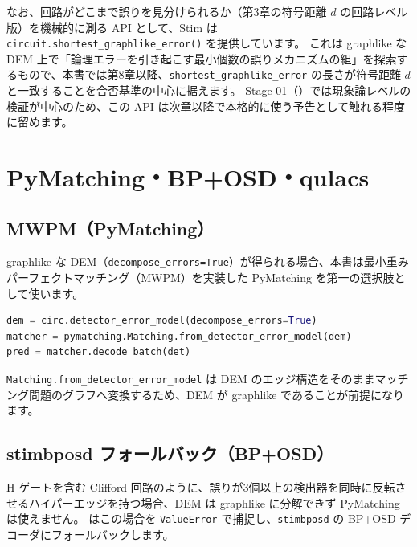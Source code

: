 なお、回路がどこまで誤りを見分けられるか（第3章の符号距離 $d$ の回路レベル版）を機械的に測る API として、Stim は \texttt{circuit.shortest\_graphlike\_error()} を提供しています。
これは graphlike な DEM 上で「論理エラーを引き起こす最小個数の誤りメカニズムの組」を探索するもので、本書では第8章以降、\texttt{shortest\_graphlike\_error} の長さが符号距離 $d$ と一致することを合否基準の中心に据えます。
Stage 01（）では現象論レベルの検証が中心のため、この API は次章以降で本格的に使う予告として触れる程度に留めます。

\section{PyMatching・BP+OSD・qulacs}\label{sec:decoders}

\subsection{MWPM（PyMatching）}

graphlike な DEM（\texttt{decompose\_errors=True}）が得られる場合、本書は最小重みパーフェクトマッチング（MWPM）を実装した PyMatching を第一の選択肢として使います。

\begin{lstlisting}[language=Python, caption={MWPM デコードの基本形（src/stages/01\_mpp/src/ftqc/ 各ファイル共通）}]
dem = circ.detector_error_model(decompose_errors=True)
matcher = pymatching.Matching.from_detector_error_model(dem)
pred = matcher.decode_batch(det)
\end{lstlisting}

\texttt{Matching.from\_detector\_error\_model} は DEM のエッジ構造をそのままマッチング問題のグラフへ変換するため、DEM が graphlike であることが前提になります。

\subsection{stimbposd フォールバック（BP+OSD）}

H ゲートを含む Clifford 回路のように、誤りが3個以上の検出器を同時に反転させるハイパーエッジを持つ場合、DEM は graphlike に分解できず PyMatching は使えません。
 はこの場合を \texttt{ValueError} で捕捉し、\texttt{stimbposd} の BP+OSD デコーダにフォールバックします。

